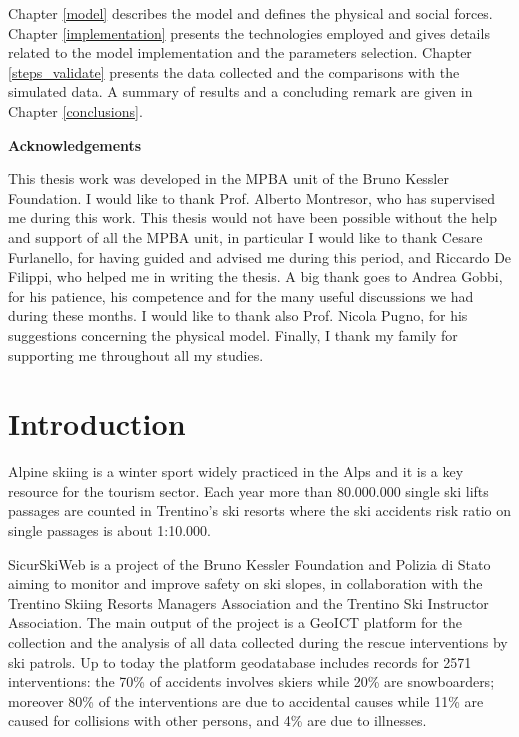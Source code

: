 \documentclass[12pt,a4paper,twoside]{book}
\makeatletter
\newcommand\ackname{Acknowledgements}
\newenvironment{acknowledgements}{
  \newpage
  \thispagestyle{empty}
  \null\vfil
  \@beginparpenalty\@lowpenalty
  \begin{center}
    \bfseries \ackname
    \@endparpenalty\@M
  \end{center}}
{\par\vfil\null\endtitlepage}
\makeatother
\begin{document}
Chapter \ref{model} describes the model and defines the physical and social forces. Chapter \ref{implementation} presents the technologies employed and gives details related to the model implementation and the parameters selection. Chapter \ref{steps_validate} presents the data collected and the comparisons with the simulated data. A summary of results and a concluding remark are given in Chapter \ref{conclusions}.

\newpage
\mbox{}
\begin{acknowledgements}
This thesis work was developed in the MPBA unit of the Bruno Kessler Foundation. I would like to thank Prof. Alberto Montresor, who has supervised me during this work. This thesis would not have been possible without the help and support of all the MPBA unit, in particular I would like to thank Cesare Furlanello, for having guided and advised me during this period, and Riccardo De Filippi, who helped me in writing the thesis. A big thank goes to Andrea Gobbi, for his patience, his competence and for the many useful discussions we had during these months. I would like to thank also Prof. Nicola Pugno, for his suggestions concerning the physical model. Finally, I thank my family for supporting me throughout all my studies.
\end{acknowledgements}

\tableofcontents

\chapter{Introduction}
Alpine skiing is a winter sport widely practiced in the Alps and it is a key resource for the tourism sector. Each year more than 80.000.000 single ski lifts passages are counted in Trentino's ski resorts where the ski accidents risk ratio on single passages is about 1:10.000.

SicurSkiWeb is a project of the Bruno Kessler Foundation and Polizia di Stato aiming to monitor and improve safety on ski slopes, in collaboration with the Trentino Skiing Resorts Managers Association and the Trentino Ski Instructor Association. The main output of the project is a GeoICT platform for the collection and the analysis of all data collected during the rescue interventions by ski patrols. Up to today the platform geodatabase includes records for 2571 interventions: the 70\% of accidents involves skiers while 20\% are snowboarders; moreover 80\% of the interventions are due to accidental causes while 11\% are caused for collisions with other persons, and 4\% are due to illnesses.
\end{document}
